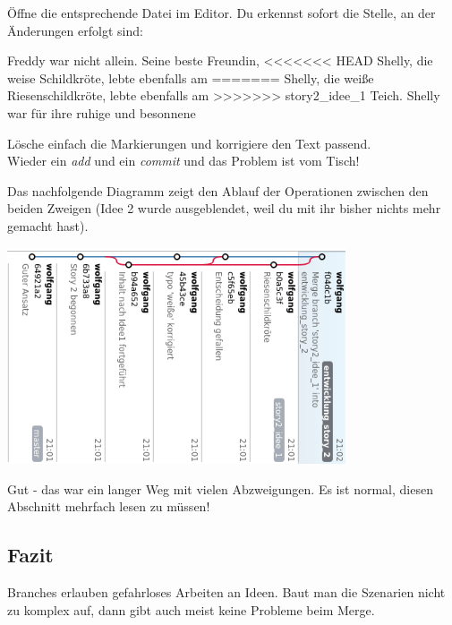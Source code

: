 \documentclass[
  letterpaper,
  DIV=11]{scrreprt}
\newenvironment{Shaded}{\begin{snugshade}}{\end{snugshade}}
\newcommand{\ExtensionTok}[1]{\textcolor[rgb]{0.00,0.23,0.31}{#1}}
\newcommand{\NormalTok}[1]{\textcolor[rgb]{0.00,0.23,0.31}{#1}}
\newcommand{\OperatorTok}[1]{\textcolor[rgb]{0.37,0.37,0.37}{#1}}
\begin{document}
Öffne die entsprechende Datei im Editor. Du erkennst sofort die Stelle,
an der Änderungen erfolgt sind:

\begin{Shaded}
\begin{Highlighting}[]
\ExtensionTok{Freddy}\NormalTok{ war nicht allein. Seine beste Freundin,}
\OperatorTok{\textless{}\textless{}\textless{}\textless{}\textless{}\textless{}\textless{}}\NormalTok{ HEAD}
\ExtensionTok{Shelly,}\NormalTok{ die weise Schildkröte, lebte ebenfalls am}
\ExtensionTok{=======}
\ExtensionTok{Shelly,}\NormalTok{ die weiße Riesenschildkröte, lebte ebenfalls am}
\OperatorTok{\textgreater{}\textgreater{}\textgreater{}\textgreater{}\textgreater{}\textgreater{}\textgreater{}}\NormalTok{ story2\_idee\_1}
\ExtensionTok{Teich.}\NormalTok{ Shelly war für ihre ruhige und besonnene}
\end{Highlighting}
\end{Shaded}

Lösche einfach die Markierungen und korrigiere den Text passend.\\
Wieder ein \emph{add} und ein \emph{commit} und das Problem ist vom
Tisch!

Das nachfolgende Diagramm zeigt den Ablauf der Operationen zwischen den
beiden Zweigen (Idee 2 wurde ausgeblendet, weil du mit ihr bisher nichts
mehr gemacht hast).

\includegraphics[width=10cm,height=\textheight,keepaspectratio]{bilder/bash/buch_2.png}

Gut - das war ein langer Weg mit vielen Abzweigungen. Es ist normal,
diesen Abschnitt mehrfach lesen zu müssen!

\subsection{Fazit}\label{fazit}

Branches erlauben gefahrloses Arbeiten an Ideen. Baut man die Szenarien
nicht zu komplex auf, dann gibt auch meist keine Probleme beim Merge.
\end{document}
